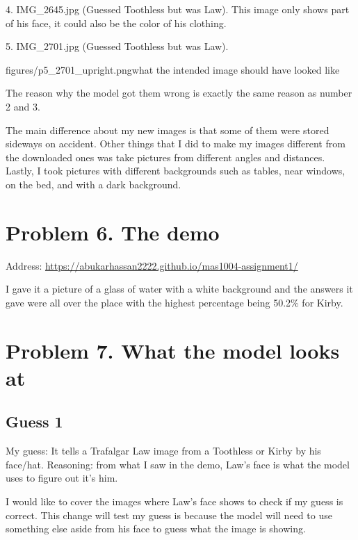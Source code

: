 \documentclass[11pt]{article}
\begin{document}
4. IMG\_2645.jpg (Guessed Toothless but was Law). This image only shows part
of his face, it could also be the color of his clothing.


5. IMG\_2701.jpg (Guessed Toothless but was Law).

           {figures/p5_2701_upright.png}{what the intended image should have
           looked like}

The reason why the model got them wrong is exactly the same reason as number 2
and 3.

The main difference about my new images is that some of them were stored
sideways on accident. Other things that I did to make my images different from
the downloaded ones was take pictures from different angles and distances.
Lastly, I took pictures with different backgrounds such as tables, near
windows, on the bed, and with a dark background.

\section*{Problem 6. The demo}

Address: \url{https://abukarhassan2222.github.io/mas1004-assignment1/}

I gave it a picture of a glass of water with a white background and the
answers it gave were all over the place with the highest percentage being
50.2\% for Kirby.

\section*{Problem 7. What the model looks at}

\subsection*{Guess 1}

My guess: It tells a Trafalgar Law image from a Toothless or Kirby by his
face/hat. Reasoning: from what I saw in the demo, Law's face is what the model
uses to figure out it's him.

I would like to cover the images where Law's face shows to check if my guess
is correct. This change will test my guess is because the model will need to
use something else aside from his face to guess what the image is showing.
\end{document}
